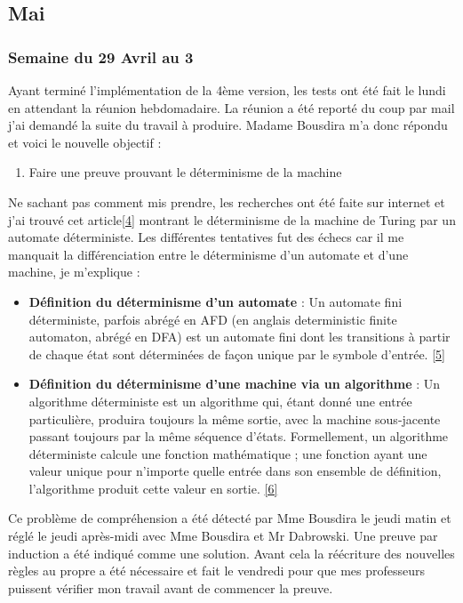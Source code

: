 \documentclass[10pt,a4paper]{article}
\begin{document}
		\subsection{Mai}
		
		\subsubsection{Semaine du 29 Avril au 3}
			Ayant terminé l'implémentation de la 4ème version, les tests ont été fait le lundi en attendant la réunion hebdomadaire. La réunion a été reporté du coup par mail j'ai demandé la suite du travail à produire. Madame Bousdira m'a donc répondu et voici le nouvelle objectif :
				\begin{enumerate}
					\item Faire une preuve prouvant le déterminisme de la machine
				\end{enumerate} 
			\bigbreak
			Ne sachant pas comment mis prendre, les recherches ont été faite sur internet et j'ai trouvé cet article\hyperref[Turing]{[4]} montrant le déterminisme de la machine de Turing par un automate déterministe. Les différentes tentatives fut des échecs car il me manquait la différenciation entre le déterminisme d'un automate et d'une machine, je m'explique :
				\begin{itemize}
					\item[] \textbf{Définition du déterminisme d'un automate} : Un automate fini déterministe, parfois abrégé en AFD (en anglais deterministic finite automaton, abrégé en DFA) est un automate fini dont les transitions à partir de chaque état sont déterminées de façon unique par le symbole d'entrée. \hyperref[AFD]{[5]}
					\item[] \textbf{Définition du déterminisme d'une machine via un algorithme} : Un algorithme déterministe est un algorithme qui, étant donné une entrée particulière, produira toujours la même sortie, avec la machine sous-jacente passant toujours par la même séquence d'états. 
					\smallbreak
					Formellement, un algorithme déterministe calcule une fonction mathématique ; une fonction ayant une valeur unique pour n'importe quelle entrée dans son ensemble de définition, l'algorithme produit cette valeur en sortie. \hyperref[MFD]{[6]}
				\end{itemize} 
		\medbreak
		Ce problème de compréhension a été détecté par Mme Bousdira le jeudi matin et réglé le jeudi après-midi avec Mme Bousdira et Mr Dabrowski. Une preuve par induction a été indiqué comme une solution.\smallbreak
		Avant cela la réécriture des nouvelles règles au propre a été nécessaire et fait le vendredi pour que mes professeurs puissent vérifier mon travail avant de commencer la preuve.  
		
\end{document}
